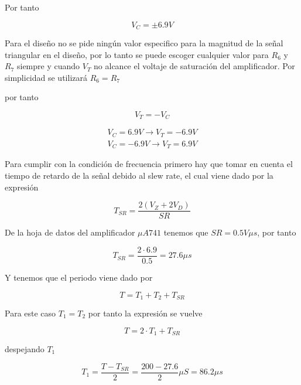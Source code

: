 Por tanto

\begin{equation*}
    V_{C} = \pm 6.9V
\end{equation*}

Para el diseño no se pide ningún valor especifico para la magnitud de la señal triangular en el diseño, por lo tanto se puede escoger cualquier valor para $R_6$ y $R_7$ siempre y cuando $V_T$ no alcance el voltaje de saturación del amplificador. Por simplicidad se utilizará $R_6 = R_7$

por tanto 

\begin{equation*}
    V_T = - V_C
\end{equation*}

\begin{align}
    V_C= 6.9V \rightarrow V_T = -6.9V \\
    V_C = -6.9V \rightarrow V_T = 6.9V
\end{align}

Para cumplir con la condición de frecuencia primero hay que tomar en cuenta el tiempo de retardo de la señal debido al slew rate, el cual viene dado por la expresión

\begin{equation*}
    T_{SR} = \frac{2(V_Z + 2 V_D)}{SR}
\end{equation*}

De la hoja de datos del amplificador $\mu A741$ tenemos que $SR = 0.5 V\mu s$, por tanto

\begin{equation*}
    T_{SR} = \frac{2 \cdot 6.9}{0.5} = 27.6 \mu s
\end{equation*}

Y tenemos que el periodo viene dado por 

\begin{equation*}
    T = T_1 + T_2 + T_{SR}
\end{equation*}

Para este caso $T_1 = T_2$ por tanto la expresión se vuelve

\begin{equation*}
    T = 2 \cdot T_1 + T_{SR}
\end{equation*}

despejando $T_1$

\begin{equation*}
    T_1 = \frac{T - T_{SR}}{2} = \frac{200 - 27.6}{2} \mu S = 86.2 \mu s
\end{equation*}

